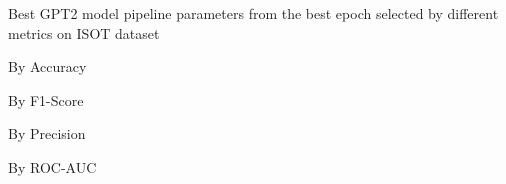 \begin{table}[!htbp]
    \caption{Best GPT2 model pipeline parameters from the best epoch selected by different metrics on ISOT dataset}
    \label{tab:isot_gpt2_pipeline_params}
    \centering

    \begin{subtable}[t]{0.48\linewidth}
        \scriptsize
        \caption{By Accuracy}
        
    \end{subtable}
    \hfill
    \begin{subtable}[t]{0.48\linewidth}
        \scriptsize
        \caption{By F1-Score}
        
    \end{subtable}

    \vspace{1em}

    \begin{subtable}[t]{0.48\linewidth}
        \scriptsize
        \caption{By Precision}
        
    \end{subtable}
    \hfill
    \begin{subtable}[t]{0.48\linewidth}
        \scriptsize
        \caption{By ROC-AUC}
        
    \end{subtable}

\end{table}